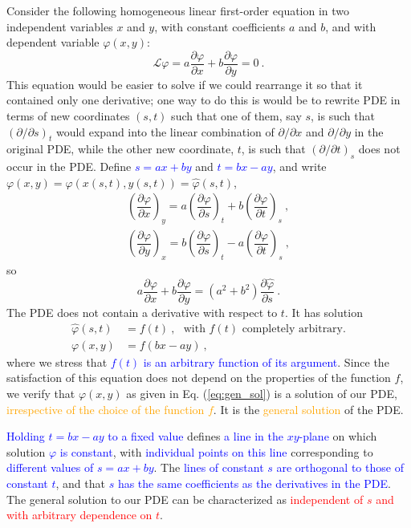 \documentclass[12pt,a4paper]{article}
\begin{document}
\cite{arfken} Consider the following homogeneous linear first-order equation in two independent variables $x$ and $y$, with constant coefficients $a$ and $b$, and with dependent variable $\varphi(x, y)$:
\begin{equation}
\mathcal L \varphi = a \dfrac{\partial \varphi}{\partial x} + b\dfrac{\partial \varphi}{\partial y} = 0 ~.
\label{eq:1pde}
\end{equation}
This equation would be easier to solve if we could rearrange it so that it contained only one derivative; one way to do this is would be to rewrite PDE in terms of new coordinates $(s,t)$ such that one of them, say $s$, is such that $(\partial/\partial s)_t$ would expand into the linear combination of $\partial/\partial x$ and $\partial/\partial y$ in the original PDE, while the other new coordinate, $t$, is such that $(\partial/\partial t)_s$ does not occur in the PDE. Define \textcolor{blue}{$s = ax+by$} and \textcolor{blue}{$t = bx -ay$}, and write $\varphi(x, y) = \varphi(x(s,t), y(s,t)) = \hat{\varphi}(s,t)$, 
\begin{align*}
\left(\dfrac{\partial \varphi}{\partial x} \right)_y = a \left(\dfrac{\partial \varphi}{\partial s} \right)_t +b\left(\dfrac{\partial \varphi}{\partial t} \right)_s ~, \\
\left(\dfrac{\partial \varphi}{\partial y} \right)_x = b \left(\dfrac{\partial \varphi}{\partial s} \right)_t -a\left(\dfrac{\partial \varphi}{\partial t} \right)_s ~,
\end{align*}
so
\begin{equation}
a \dfrac{\partial \varphi}{\partial x} +b\dfrac{\partial \varphi}{\partial y} = (a^2 +b^2) \dfrac{\partial \hat{\varphi}}{\partial s} ~.
\end{equation}
The PDE does not contain a derivative with respect to $t$. It has solution
\begin{align}
\hat{\varphi}(s, t) &= f(t) ~, ~~~\text{with $f(t)$ completely arbitrary.} \\
\varphi(x,y) &= f(bx-ay) ~,
\label{eq:gen_sol}
\end{align}
where we stress that \textcolor{blue}{$f(t)$ is an arbitrary function of its argument}. Since the satisfaction of this equation does not depend on the properties of the function $f$, we verify that $\varphi(x, y)$ as given in Eq. (\ref{eq:gen_sol}) is a solution of our PDE, \textcolor{orange}{irrespective of the choice of the function $f$}. It is the \textcolor{orange}{general solution} of the PDE.

\textcolor{blue}{Holding $t = bx - ay$ to a fixed value} defines \textcolor{blue}{a line in the $xy$-plane} on which solution \textcolor{blue}{$\varphi$ is constant}, with \textcolor{blue}{individual points on this line} corresponding to \textcolor{blue}{different values of $s = ax + by$}. The \textcolor{blue}{lines of constant $s$ are orthogonal to those of constant $t$}, and that \textcolor{blue}{$s$ has the same coefficients as the derivatives in the PDE}. The general solution to our PDE can be characterized as \textcolor{red}{independent of $s$ and with arbitrary dependence on $t$}.
\end{document}
